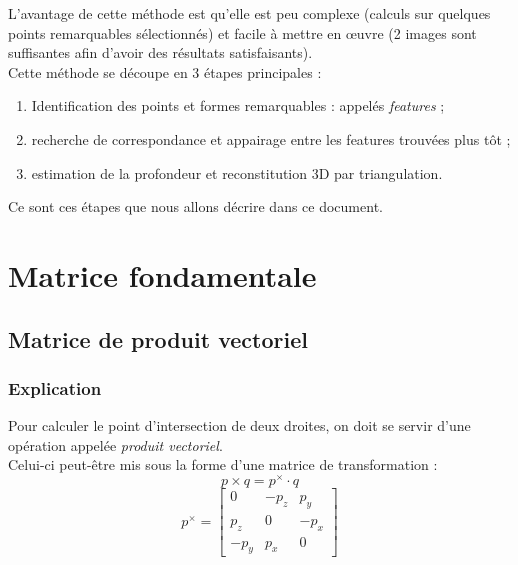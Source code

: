 \documentclass[a4paper]{article}
\begin{document}
L'avantage de cette méthode est qu'elle est peu complexe (calculs sur quelques points remarquables sélectionnés) et facile à mettre en œuvre (2 images sont suffisantes afin d'avoir des résultats satisfaisants).\\

Cette méthode se découpe en 3 étapes principales :
\begin{enumerate}
  \item Identification des points et formes remarquables : appelés {\em features} ;
  \item recherche de correspondance et appairage entre les features trouvées plus tôt ;
  \item estimation de la profondeur et reconstitution 3D par triangulation.
\end{enumerate}

Ce sont ces étapes que nous allons décrire dans ce document.

\clearpage

\section{Matrice fondamentale}

\subsection{Matrice de produit vectoriel}

\subsubsection{Explication}

Pour calculer le point d'intersection de deux droites, on doit se servir d'une opération appelée {\em produit vectoriel}.\\
Celui-ci peut-être mis sous la forme d'une matrice de transformation :
\begin{equation}
  p \times q = p^\times \cdot q
\end{equation}
\begin{equation}
  p^\times =
  \begin{bmatrix}
    0 & -p_z & p_y\\
    p_z & 0 & -p_x\\
    -p_y & p_x & 0
  \end{bmatrix}
\end{equation}
\end{document}
